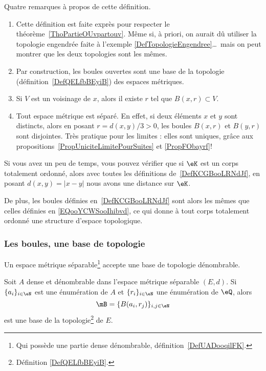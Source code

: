 \begin{remark}  \label{RemQDRooKnwKk}
    Quatre remarques à propos de cette définition.
    \begin{enumerate}
    \item
      Cette définition est faite exprès pour respecter le théorème~\ref{ThoPartieOUvpartouv}. Même si, à priori, on aurait dû utiliser la topologie engendrée faite à l'exemple \ref{DefTopologieEngendree}\dots\ mais on peut montrer que les deux topologies sont les mêmes.
    \item      \label{ITEMooUIHJooXAFaIz}
      Par construction, les boules ouvertes sont une base de la topologie (définition~\ref{DefQELfbBEyiB}) des espaces métriques.
    \item       \label{ITEMooUIHJooXAFaJa}
      Si \( V\) est un voisinage de \( x\), alors il existe \( r\) tel que \( B(x,r)\subset V\).
    \item
      Tout espace métrique est séparé. En effet, si deux éléments \( x \) et \( y \) sont distincts, alors en posant \( r = d(x , y) / 3 > 0 \), les boules \( B(x,r) \) et \( B(y,r)\) sont disjointes. Très pratique pour les limites : elles sont uniques, grâce aux propositions~\ref{PropUniciteLimitePourSuites} et \ref{PropFObayrf}!
    \end{enumerate}
\end{remark}

\begin{normaltext}
    Si vous avez un peu de temps, vous pouvez vérifier que si \( \eK\) est un corps totalement ordonné, alors avec toutes les définitions de~\ref{DefKCGBooLRNdJf}, en posant \( d(x,y)=| x-y |\) nous avons une distance sur \( \eK\).

    De plus, les boules définies en~\ref{DefKCGBooLRNdJf} sont alors les mêmes que celles définies en \eqref{EQooYCWSooIhibvd}, ce qui donne à tout corps totalement ordonné une structure d'espace topologique.
\end{normaltext}

\subsubsection{Les boules, une base de topologie}

\begin{proposition} \label{PropNBSooraAFr}
    Un espace métrique séparable\footnote{Qui possède une partie dense dénombrable, définition~\ref{DefUADooqilFK}.} accepte une base de topologie dénombrable.

     Soit \( A\) dense et dénombrable dans l'espace métrique séparable \( (E,d)\). Si \( \{ a_i \}_{i\in \eN}\) est une énumération de \( A\) et \( \{ r_i \}_{i\in \eN}\) une énumération de \( \eQ\), alors
    \begin{equation}
        \mB=\{ B(a_i,r_j) \}_{i,j\in \eN}
    \end{equation}
    est une base de la topologie\footnote{Définition \ref{DefQELfbBEyiB}.} de \( E\).
\end{proposition}

